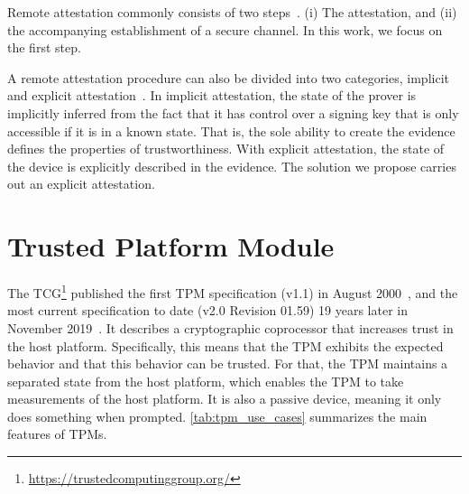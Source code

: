 Remote attestation commonly consists of two steps~\cite{McCune2008}.
(i) The attestation, and (ii) the accompanying establishment of a secure channel.
In this work, we focus on the first step.

A remote attestation procedure can also be divided into two categories, implicit and explicit attestation~\cite{dice-layering-arch}.
In implicit attestation, the state of the prover is implicitly inferred from the fact that it has control over a signing key that is only accessible if it is in a known state.
That is, the sole ability to create the evidence defines the properties of trustworthiness.
With explicit attestation, the state of the device is explicitly described in the evidence.
The solution we propose carries out an explicit attestation.

\section{Trusted Platform Module}\label{sec:tpm}

The \ac{TCG}\footnote{\url{https://trustedcomputinggroup.org/}} published the first TPM specification (v1.1) in August 2000~\cite{tpm11}, and the most current specification to date (v2.0 Revision 01.59) 19 years later in November 2019~\cite{tpm20}.
It describes a cryptographic coprocessor that increases trust in the host platform.
Specifically, this means that the TPM exhibits the expected behavior and that this behavior can be trusted.
For that, the TPM maintains a separated state from the host platform, which enables the TPM to take measurements of the host platform.
It is also a passive device, meaning it only does something when prompted.
\autoref{tab:tpm_use_cases} summarizes the main features of TPMs.



